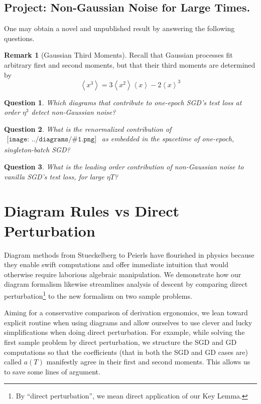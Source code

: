 \documentclass{article}
\theoremstyle{plain}
\newtheorem*{quest*}{Question}
\theoremstyle{definition}
\newtheorem*{rmk*}{Remark}
\newcommand{\wang}[1]{\left\langle#1\right\rangle}
\newcommand{\sdia}[1]{\begin{gathered}\texttt{[image: ../diagrams/\#1.png]}\end{gathered}}
\begin{document}
    \subsection{
        Project: Non-Gaussian Noise for Large Times.
    }
        One may obtain a novel and unpublished result by answering the
        following questions.

        \begin{rmk*}[Gaussian Third Moments]
            Recall that Gaussian processes fit arbitrary first and second
            moments, but that their third moments are determined by 
            $$
                \wang{x^3} = 3\wang{x^2}\wang{x} - 2\wang{x}^3
            $$
        \end{rmk*}
        \begin{quest*}
            Which diagrams that contribute to one-epoch SGD's test loss at
            order $\eta^3$ detect non-Gaussian noise?
        \end{quest*}

        \begin{quest*}
            What is the renormalized contribution of $\sdia{(012-3)(03-13-23)}$
            as embedded in the spacetime of one-epoch, singleton-batch SGD?
        \end{quest*}
       
        \begin{quest*}
            What is the leading order contribution of non-Gaussian noise to 
            vanilla SGD's test loss, for large $\eta T$?
        \end{quest*}

      
\section{
    {\colorbox{moolime}{Diagram Rules}} vs {\colorbox{moosky}{Direct Perturbation}}
} \label{sect:compare}
    Diagram methods from Stueckelberg to Peierls have flourished in physics
    because they enable swift computations and offer immediate intuition that
    would otherwise require laborious algebraic manipulation.  We demonstrate
    how our diagram formalism likewise streamlines analysis of descent by
    comparing direct perturbation\footnote{
        By ``direct perturbation'', we mean direct application of our Key
        Lemma.
    }
    to the new formalism on two sample problems.

    Aiming for a conservative comparison of derivation ergonomics, we lean
    toward explicit routine when using diagrams and allow ourselves to use
    clever and lucky simplifications when doing direct perturbation.  For
    example, while solving the first sample problem by direct perturbation,
    we structure the SGD and GD computations so that the coefficients (that in
    both the SGD and GD cases are) called $a(T)$ manifestly agree in their
    first and second moments.  This allows us to save some lines of argument.
\end{document}
